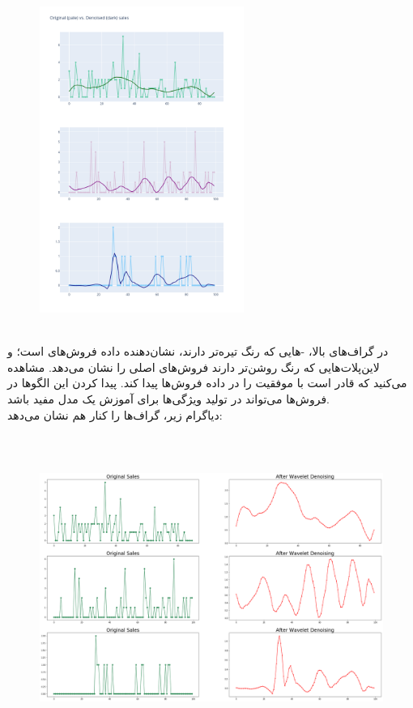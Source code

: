 \documentclass{article}
\begin{document}
\begin{figure}[hbt!]
\centering
\includegraphics[width=\textwidth,height=10cm]{Outputs/6.png}
\end{figure}
\ \\
در گراف‌های بالا، -هایی که رنگ تیره‌تر دارند، نشان‌دهنده‌ داده فروش‌های  است؛ و لاین‌پلات‌هایی که رنگ روشن‌تر دارند فروش‌های اصلی را نشان می‌دهد. مشاهده می‌کنید که  قادر است با موفقیت 
را در داده فروش‌ها پیدا کند. پیدا کردن این الگوها در فروش‌ها می‌تواند در تولید ویژگی‌ها برای آموزش یک مدل مفید باشد.\\
دیاگرام زیر، گراف‌ها را کنار هم نشان می‌دهد:
\begin{figure}[hbt!]
	\centering
	\includegraphics[width=\textwidth,height=10cm]{Outputs/8.png}
\end{figure}
\ \\
\end{document}
